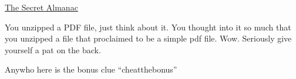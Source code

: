 \documentclass[a4paper]{article}
\begin{document}
\begin{center}
\Large{\underline{The Secret Almanac}}
\end{center}

\newenvironment{noSepEnumerate}
{ \begin{enumerate}
    \setlength{\itemsep}{1pt}
    \setlength{\parskip}{0pt}
    \setlength{\parsep}{0pt}}
{ \end{enumerate}}
You unzipped a PDF file, just think about it. You thought into it so much that you unzipped a file that proclaimed to be a simple pdf file. Wow. Seriously give yourself a pat on the back.

Anywho here is the bonus clue ``cheatthebonus''
\end{document}
